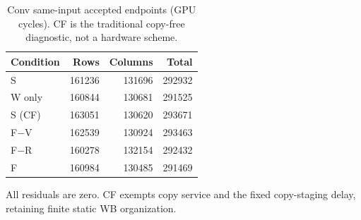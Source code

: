 \begin{table}[t]
\centering
\caption{Conv same-input accepted endpoints (GPU cycles). CF is the traditional copy-free diagnostic, not a hardware scheme.}
\label{tab:conv-six-conditions}
\begin{tabular}{lrrr}
\hline
Condition & Rows & Columns & Total \\
\hline
S & 161236 & 131696 & 292932 \\
W only & 160844 & 130681 & 291525 \\
S (CF) & 163051 & 130620 & 293671 \\
F$-$V & 162539 & 130924 & 293463 \\
F$-$R & 160278 & 132154 & 292432 \\
F & 160984 & 130485 & 291469 \\
\hline
\end{tabular}
{\footnotesize All residuals are zero. CF exempts copy service and the fixed copy-staging delay, retaining finite static WB organization.}
\end{table}
